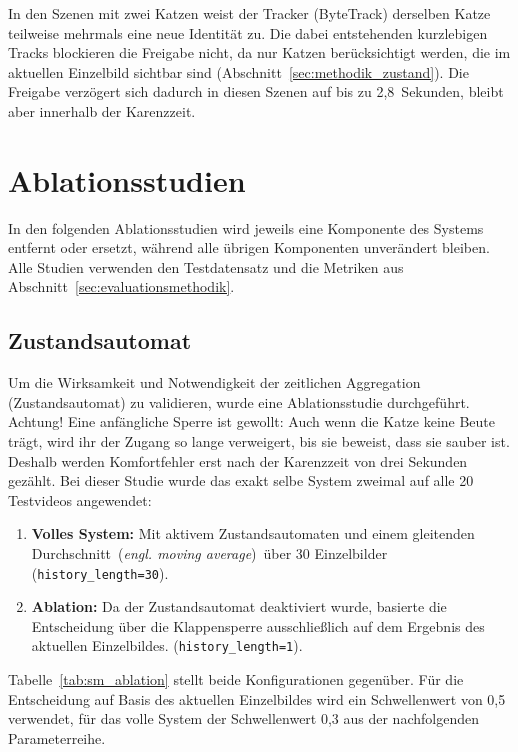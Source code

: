 In den Szenen mit zwei Katzen weist der Tracker (ByteTrack) derselben Katze teilweise mehrmals eine neue Identität zu. Die dabei entstehenden kurzlebigen Tracks blockieren die Freigabe nicht, da nur Katzen berücksichtigt werden, die im aktuellen Einzelbild sichtbar sind (Abschnitt~\ref{sec:methodik_zustand}). Die Freigabe verzögert sich dadurch in diesen Szenen auf bis zu 2,8~Sekunden, bleibt aber innerhalb der Karenzzeit.

\section{Ablationsstudien}
In den folgenden Ablationsstudien wird jeweils eine Komponente des Systems entfernt oder ersetzt, während alle übrigen Komponenten unverändert bleiben. Alle Studien verwenden den Testdatensatz und die Metriken aus Abschnitt~\ref{sec:evaluationsmethodik}.

\subsection{Zustandsautomat}
\label{sec:ablation_sm}
Um die Wirksamkeit und Notwendigkeit der zeitlichen Aggregation (Zustandsautomat) zu validieren, wurde eine Ablationsstudie durchgeführt. Achtung! Eine anfängliche Sperre ist gewollt: Auch wenn die Katze keine Beute trägt, wird ihr der Zugang so lange verweigert, bis sie beweist, dass sie sauber ist. Deshalb werden Komfortfehler erst nach der Karenzzeit von drei Sekunden gezählt. Bei dieser Studie wurde das exakt selbe System zweimal auf alle 20 Testvideos angewendet:

\begin{enumerate}
    \item \textbf{Volles System:} Mit aktivem Zustandsautomaten und einem \glqq gleitenden Durchschnitt\grqq\ (\emph{engl. moving average})\ über 30 Einzelbilder (\texttt{history\_length=30}).
    \item \textbf{Ablation:} Da der Zustandsautomat deaktiviert wurde, basierte die Entscheidung über die Klappensperre ausschließlich auf dem Ergebnis des aktuellen Einzelbildes. (\texttt{history\_length=1}).
\end{enumerate}


Tabelle~\ref{tab:sm_ablation} stellt beide Konfigurationen gegenüber. Für die Entscheidung auf Basis des aktuellen Einzelbildes wird ein Schwellenwert von 0,5 verwendet, für das volle System der Schwellenwert 0,3 aus der nachfolgenden Parameterreihe.

